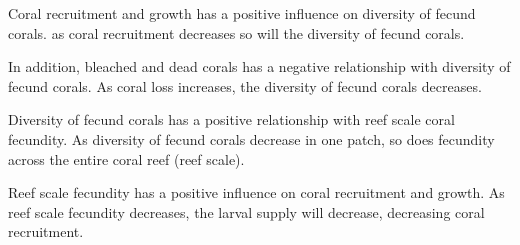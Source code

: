 \documentclass[11pt, addpoints]{exam}
\begin{document}
\begin{questions}
\begin{solution}
Coral recruitment and growth has a positive influence on diversity of fecund corals. as coral recruitment decreases so will the diversity of fecund corals. 

In addition, bleached and dead corals has a negative relationship with diversity of fecund corals. As coral loss increases, the diversity of fecund corals decreases. 

Diversity of fecund corals has a positive relationship with reef scale coral fecundity. As diversity of fecund corals decrease in one patch, so does fecundity across the entire coral reef (reef scale).

Reef scale fecundity has a positive influence on coral recruitment and growth. As reef scale fecundity decreases, the larval supply will decrease, decreasing coral recruitment.

\end{solution}


\end{questions}
\end{document}
